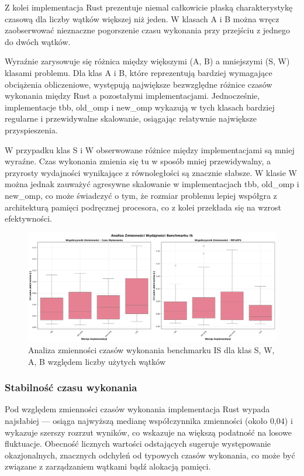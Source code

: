 Z kolei implementacja Rust prezentuje niemal całkowicie płaską charakterystykę czasową dla liczby wątków większej niż jeden. W klasach A i B można wręcz zaobserwować nieznaczne pogorszenie czasu wykonania przy przejściu z jednego do dwóch wątków.

Wyraźnie zarysowuje się różnica między większymi (A, B) a mniejszymi (S, W) klasami problemu. Dla klas A i B, które reprezentują bardziej wymagające obciążenia obliczeniowe, występują największe bezwzględne różnice czasów wykonania między Rust a pozostałymi implementacjami. Jednocześnie, implementacje tbb, old\_omp i new\_omp wykazują w tych klasach bardziej regularne i przewidywalne skalowanie, osiągając relatywnie największe przyspieszenia.

W przypadku klas S i W obserwowane różnice między implementacjami są mniej wyraźne. Czas wykonania zmienia się tu w sposób mniej przewidywalny, a przyrosty wydajności wynikające z równoległości są znacznie słabsze. W klasie W można jednak zauważyć agresywne skalowanie w implementacjach tbb, old\_omp i new\_omp, co może świadczyć o tym, że rozmiar problemu lepiej współgra z architekturą pamięci podręcznej procesora, co z kolei przekłada się na wzrost efektywności.

\begin{figure}[H]
    \centering
    \includegraphics[width=\textwidth]{analiza/images/parallel/is/x86/is_analiza_zmiennosci.png}
    \caption{Analiza zmienności czasów wykonania benchmarku IS dla klas S, W, A, B względem liczby użytych wątków}
    \label{is_analiza_zmiennosci_x86}
\end{figure}
\subsubsection{Stabilność czasu wykonania}
Pod względem zmienności czasów wykonania implementacja Rust wypada najsłabiej — osiąga najwyższą medianę współczynnika zmienności (około 0,04) i wykazuje szerszy rozrzut wyników, co wskazuje na większą podatność na losowe fluktuacje. Obecność licznych wartości odstających sugeruje występowanie okazjonalnych, znacznych odchyleń od typowych czasów wykonania, co może być związane z zarządzaniem wątkami bądź alokacją pamięci.

